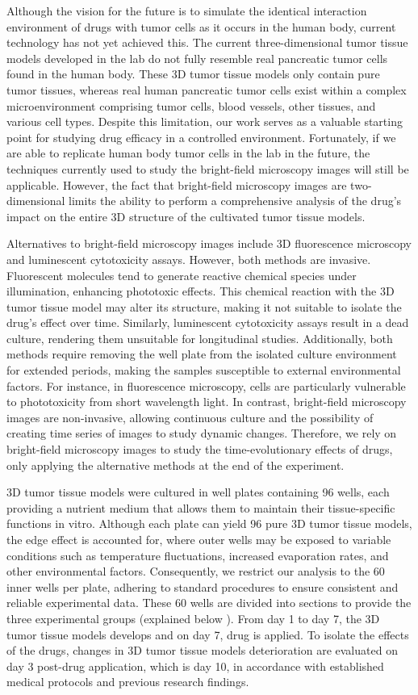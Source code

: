 \documentclass[12pt,twoside,a4paper,parskip]{scrbook} %
\begin{document}
Although the vision for the future is to simulate the identical interaction environment of drugs with tumor cells as it occurs in the human body, current technology has not yet achieved this. The current three-dimensional tumor tissue models developed in the lab do not fully resemble real pancreatic tumor cells found in the human body. These 3D tumor tissue models only contain pure tumor tissues, whereas real human pancreatic tumor cells exist within a complex microenvironment comprising tumor cells, blood vessels, other tissues, and various cell types. Despite this limitation, our work serves as a valuable starting point for studying drug efficacy in a controlled environment. Fortunately, if we are able to replicate human body tumor cells in the lab in the future, the techniques currently used to study the bright-field microscopy images will still be applicable. However, the fact that bright-field microscopy images are two-dimensional limits the ability to perform a comprehensive analysis of the drug's impact on the entire 3D structure of the cultivated tumor tissue models.

Alternatives to bright-field microscopy images include 3D fluorescence microscopy and luminescent cytotoxicity assays. However, both methods are invasive. Fluorescent molecules tend to generate reactive chemical species under illumination, enhancing phototoxic effects. This chemical reaction with the 3D tumor tissue model may alter its structure, making it not suitable to isolate the drug's effect over time. Similarly, luminescent cytotoxicity assays result in a dead culture, rendering them unsuitable for longitudinal studies. Additionally, both methods require removing the well plate from the isolated culture environment for extended periods, making the samples susceptible to external environmental factors. For instance, in fluorescence microscopy, cells are particularly vulnerable to phototoxicity from short wavelength light. In contrast, bright-field microscopy images are non-invasive, allowing continuous culture and the possibility of creating time series of images to study dynamic changes. Therefore, we rely on bright-field microscopy images to study the time-evolutionary effects of drugs, only applying the alternative methods at the end of the experiment.

3D tumor tissue models were cultured in well plates containing 96 wells, each providing a nutrient medium that allows them to maintain their tissue-specific functions in vitro. Although each plate can yield 96 pure 3D tumor tissue models, the edge effect is accounted for, where outer wells may be exposed to variable conditions such as temperature fluctuations, increased evaporation rates, and other environmental factors. Consequently, we restrict our analysis to the 60 inner wells per plate, adhering to standard procedures to ensure consistent and reliable experimental data. These 60 wells are divided into sections to provide the three experimental groups (explained below ). From day 1 to day 7, the 3D tumor tissue models develops and on day 7, drug is applied. To isolate the effects of the drugs, changes in 3D tumor tissue models deterioration are evaluated on day 3 post-drug application, which is day 10, in accordance with established medical protocols and previous research findings.
\end{document}
